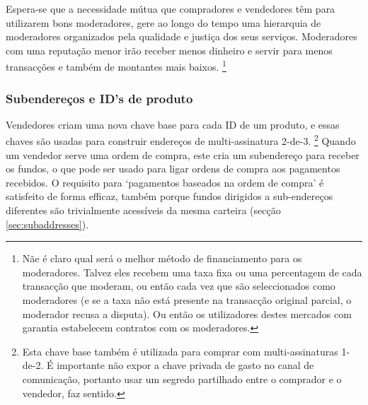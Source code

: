 Espera-se que a necessidade mútua que compradores e vendedores têm para utilizarem bons moderadores, gere ao longo do tempo uma hierarquia de moderadores organizados pela qualidade e justiça dos seus serviços. Moderadores com uma reputação menor irão receber menos dinheiro e servir para menos transacções e também de montantes mais baixos.  
\footnote{Nãe é claro qual será o melhor método de financiamento para os moderadores. Talvez eles recebem uma taxa fixa ou uma percentagem de cada transacção que moderam, ou então cada vez que são seleccionados como moderadores (e se a taxa não está presente na transacção original parcial, o moderador recusa a disputa). Ou então os utilizadores destes mercados com garantia estabelecem contratos com os moderadores.}  

\subsubsection*{Subendereços e ID's de produto}

Vendedores criam uma nova chave base para cada ID de um produto, e essas chaves são usadas para construir endereços de multi-assinatura 2-de-3. 
\footnote{Esta chave base também é utilizada para comprar com multi-assinaturas 1-de-2. É importante não expor a chave privada de gasto no canal de comunicação, portanto usar um segredo partilhado entre o comprador e o vendedor, faz sentido.} 
Quando um vendedor serve uma ordem de compra, este cria um subendereço para receber os fundos, o que pode ser usado para ligar ordens de compra aos pagamentos recebidos. 
O requisito para `pagamentos baseados na ordem de compra' é satisfeito de forma efficaz, também porque fundos dirigidos a sub-endereços diferentes são trivialmente acessíveis da mesma carteira (secção \ref{sec:subaddresses}).

